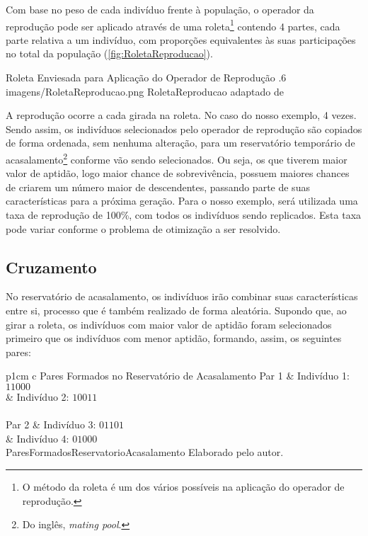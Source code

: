 Com base no peso de cada indivíduo frente à população, o operador da reprodução pode ser aplicado através de uma roleta\footnote{O método da roleta é um dos vários possíveis na aplicação do operador de reprodução.} contendo 4 partes, cada parte relativa a um indivíduo, com proporções equivalentes às suas participações no total da população (\autoref{fig:RoletaReproducao}).

\figura
	{Roleta Enviesada para Aplicação do Operador de Reprodução}
	{.6}
	{imagens/RoletaReproducao.png}
	{RoletaReproducao}
	{adaptado de \citet[p.11]{goldberg_genetic_1989}}

A reprodução ocorre a cada girada na roleta. No caso do nosso exemplo, 4 vezes. Sendo assim, os indivíduos selecionados pelo operador de reprodução são copiados de forma ordenada, sem nenhuma alteração, para um reservatório temporário de acasalamento\footnote{Do inglês, \textit{mating pool}.} conforme vão sendo selecionados. Ou seja, os que tiverem maior valor de aptidão, logo maior chance de sobrevivência, possuem maiores chances de criarem um número maior de descendentes, passando parte de suas características para a próxima geração. Para o nosso exemplo, será utilizada uma taxa de reprodução de 100\%, com todos os indivíduos sendo replicados. Esta taxa pode variar conforme o problema de otimização a ser resolvido.

\subsection{Cruzamento}

No reservatório de acasalamento, os indivíduos irão combinar suas características entre si, processo que é também realizado de forma aleatória. Supondo que, ao girar a roleta, os indivíduos com maior valor de aptidão foram selecionados primeiro que os indivíduos com menor aptidão, formando, assim, os seguintes pares:

\tabelamultilinhas
	{p{1cm} c}
	{Pares Formados no Reservatório de Acasalamento}
	{%
			{Par 1} %
				& Indivíduo 1: $11000$ \\ %
				& Indivíduo 2: $10011$ \\ \hline \\ %
			{Par 2} %
				& Indivíduo 3: $01101$ \\ %
				& Indivíduo 4: $01000$ \\ \hline %
	}
	{ParesFormadosReservatorioAcasalamento}
	{Elaborado pelo autor.}
        
